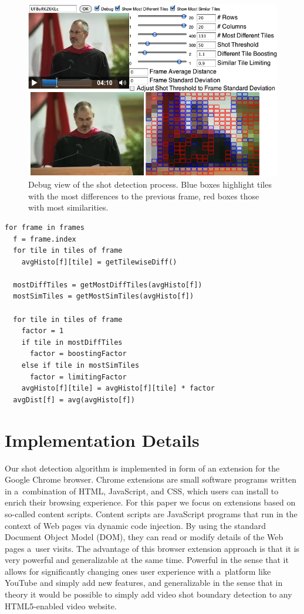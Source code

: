 \begin{figure}
\begin{center}
   \includegraphics[width=1.0\linewidth]{./algorithm.png}
\end{center}
   \caption{Debug view of the shot detection process. Blue boxes highlight tiles with the most differences to the previous frame, red boxes those with most similarities.}
\label{fig:algorithm}
\end{figure}

\begin{lstlisting}[caption=Pseudocode of shot detection algorithm., label=code:algorithm, float]
for frame in frames
  f = frame.index  
  for tile in tiles of frame      
    avgHisto[f][tile] = getTilewiseDiff()
 
  mostDiffTiles = getMostDiffTiles(avgHisto[f])
  mostSimTiles = getMostSimTiles(avgHisto[f])
 
  for tile in tiles of frame    
    factor = 1  
    if tile in mostDiffTiles
      factor = boostingFactor
    else if tile in mostSimTiles
      factor = limitingFactor
    avgHisto[f][tile] = avgHisto[f][tile] * factor
  avgDist[f] = avg(avgHisto[f])
\end{lstlisting}

\section{Implementation Details} \label{sec:implementation}
Our shot detection algorithm is implemented in form of an extension for the Google Chrome browser. Chrome extensions are small software programs written in a~combination of HTML, JavaScript, and CSS, which users can install to enrich their browsing experience. For this paper we focus on extensions based on so-called content scripts. Content scripts are JavaScript programs that run in the context of Web pages via dynamic code injection. By using the standard Document Object Model (DOM), they can read or modify details of the Web pages a~user visits. The advantage of this browser extension approach is that it is very powerful and generalizable at the same time. Powerful in the sense that it allows for significantly changing ones user experience with a~platform like YouTube and simply add new features, and generalizable in the sense that in theory it would be possible to simply add video shot boundary detection to any HTML5-enabled video website.

